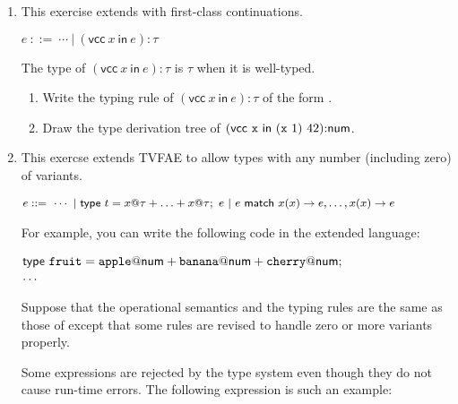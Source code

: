 \begin{enumerate}
\item This exercise extends \lang with first-class continuations.

    \vspace{0.5em}
    $e\ ::=\ \cdots\ |\ (\textsf{vcc}\ x\ \textsf{in}\ e){:}\tau$
    \vspace{0.5em}

    The type of
    $(\textsf{vcc}\ x\ \textsf{in}\ e){:}\tau$ is $\tau$ when it is well-typed.

\begin{enumerate}
  \item
    Write the typing rule of $(\textsf{vcc}\ x\ \textsf{in}\ e){:}\tau$
    of the form .
  \item Draw the type derivation tree of
    $(\textsf{vcc}\ {\code{x}}\ \textsf{in}\ {\eapp{(\eapp{\code{x}}{1})}{42}}){:}\tnum$.
\end{enumerate}

\item This exercse extends \textsf{TVFAE} to allow types with any number (including zero) of variants.

\vspace{0.5em}
$
    \small
  \begin{array}{@{}l}
    e ::=\ \cdots\ |\ {\textsf{type}}\ t=x@\tau+\ldots+x@\tau;\ e\ |\
           e\ {\textsf{match}}\ x(x)\rightarrow e,\ldots,x(x)\rightarrow e \\
  \end{array}
$

For example, you can write the following code in the extended language:

\vspace{0.5em}
$
  \begin{array}{@{}l}
    {\textsf{type}}\ \code{fruit}=\code{apple}@\tnum+\code{banana}@\tnum+\code{cherry}@\tnum;\\
    \ldots
  \end{array}
$
\vspace{0.5em}

Suppose that the operational semantics and the typing rules are the same as
those of \code{TVFAE} except that some rules are revised to handle zero or more
variants properly.

Some expressions are rejected by the type system even though
they do not cause run-time errors. The following expression is such an example:


\end{enumerate}
